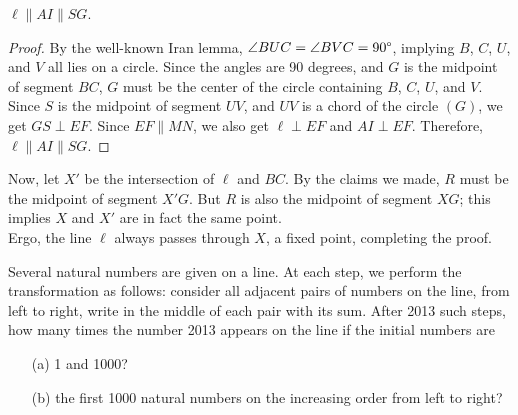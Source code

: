 \documentclass[11pt]{article}
\begin{document}
\begin{solution}
\begin{enumerate}
                \begin{claim}
                    \(\ell \parallel AI \parallel SG\).
                \end{claim}

                \begin{proof}
                    By the well-known Iran lemma, \(\angle BUC = \angle BVC = 90 \degree\), implying \(B\), \(C\), \(U\), and \(V\) all lies on a circle. Since the angles are 90 degrees, and \(G\) is the midpoint of segment \(BC\), \(G\) must be the center of the circle containing \(B\), \(C\), \(U\), and \(V\). Since \(S\) is the midpoint of segment \(UV\), and \(UV\) is a chord of the circle \((G)\), we get \(GS \perp EF\). Since \(EF \parallel MN\), we also get \(\ell \perp EF\) and \(AI \perp EF\). Therefore, \(\ell \parallel AI \parallel SG\).
                \end{proof}

                Now, let \(X'\) be the intersection of \(\ell\) and \(BC\). By the claims we made, \(R\) must be the midpoint of segment \(X'G\). But \(R\) is also the midpoint of segment \(XG\); this implies \(X\) and \(X'\) are in fact the same point.\\
                Ergo, the line \(\ell\) always passes through \(X\), a fixed point, completing the proof.
            \end{enumerate}
        \end{solution}

        \newpage

        \begin{problem}
            Several natural numbers are given on a line. At each step, we perform the transformation as follows: consider all adjacent pairs of numbers on the line, from left to right, write in the middle of each pair with its sum. After 2013 such steps, how many times the number 2013 appears on the line if the initial numbers are
            \begin{enumerate}
                \item[(a)] 1 and 1000?
                \item[(b)] the first 1000 natural numbers on the increasing order from left to right?
            \end{enumerate}
        \end{problem}
\end{document}
